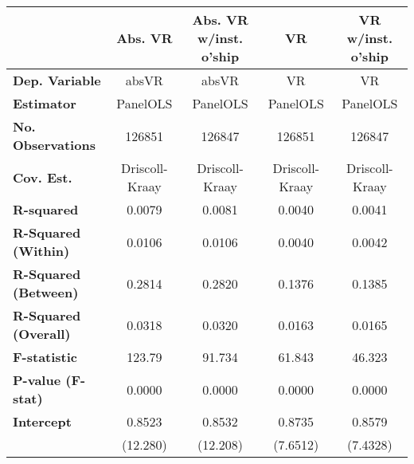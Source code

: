 \begin{center}
\begin{tabular}{lcccc}
\toprule
                                           &  \textbf{Abs. VR}  & \textbf{Abs. VR w/inst. o'ship} &    \textbf{VR}     & \textbf{VR w/inst. o'ship}  \\
\midrule
\textbf{Dep. Variable}                     &       absVR        &              absVR              &         VR         &             VR              \\
\textbf{Estimator}                         &      PanelOLS      &             PanelOLS            &      PanelOLS      &          PanelOLS           \\
\textbf{No. Observations}                  &       126851       &              126847             &       126851       &           126847            \\
\textbf{Cov. Est.}                         &   Driscoll-Kraay   &          Driscoll-Kraay         &   Driscoll-Kraay   &       Driscoll-Kraay        \\
\textbf{R-squared}                         &       0.0079       &              0.0081             &       0.0040       &           0.0041            \\
\textbf{R-Squared (Within)}                &       0.0106       &              0.0106             &       0.0040       &           0.0042            \\
\textbf{R-Squared (Between)}               &       0.2814       &              0.2820             &       0.1376       &           0.1385            \\
\textbf{R-Squared (Overall)}               &       0.0318       &              0.0320             &       0.0163       &           0.0165            \\
\textbf{F-statistic}                       &       123.79       &              91.734             &       61.843       &           46.323            \\
\textbf{P-value (F-stat)}                  &       0.0000       &              0.0000             &       0.0000       &           0.0000            \\
\midrule
\textbf{Intercept}                         &       0.8523       &              0.8532             &       0.8735       &           0.8579            \\
\textbf{ }                                 &      (12.280)      &             (12.208)            &      (7.6512)      &          (7.4328)           \\

\end{tabular}
\end{center}
